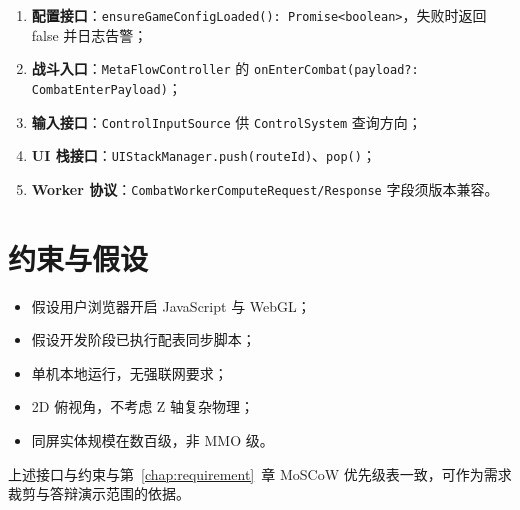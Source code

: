 \begin{enumerate}[label=\arabic*.]
  \item \textbf{配置接口}：\texttt{ensureGameConfigLoaded(): Promise<boolean>}，失败时返回 false 并日志告警；
  \item \textbf{战斗入口}：\texttt{MetaFlowController} 的 \texttt{onEnterCombat(payload?: CombatEnterPayload)}；
  \item \textbf{输入接口}：\texttt{ControlInputSource} 供 \texttt{ControlSystem} 查询方向；
  \item \textbf{UI 栈接口}：\texttt{UIStackManager.push(routeId)}、\texttt{pop()}；
  \item \textbf{Worker 协议}：\texttt{CombatWorkerComputeRequest/Response} 字段须版本兼容。
\end{enumerate}

\section{约束与假设}

\begin{itemize}
  \item 假设用户浏览器开启 JavaScript 与 WebGL；
  \item 假设开发阶段已执行配表同步脚本；
  \item 单机本地运行，无强联网要求；
  \item 2D 俯视角，不考虑 Z 轴复杂物理；
  \item 同屏实体规模在数百级，非 MMO 级。
\end{itemize}

上述接口与约束与第~\ref{chap:requirement}~章 MoSCoW 优先级表一致，可作为需求裁剪与答辩演示范围的依据。
